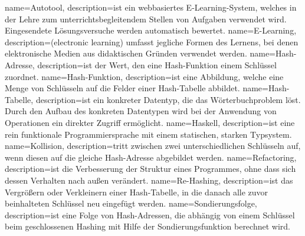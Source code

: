 {
	name=Autotool,
	description={ist ein webbasiertes E-Learning-System, welches in der Lehre zum unterrichtsbegleitendem Stellen von Aufgaben verwendet wird. Eingesendete Lösungsversuche werden automatisch bewertet.}
}
{
	name=E-Learning,
	description={(electronic learning) umfasst jegliche Formen des Lernens, bei denen elektronische Medien aus didaktischen Gründen verwendet werden.}
}
{
	name=Hash-Adresse,
	description={ist der Wert, den eine Hash-Funktion einem Schlüssel zuordnet.}
}
{
	name=Hash-Funktion,
	description={ist eine Abbildung, welche eine Menge von Schlüsseln auf die Felder einer Hash-Tabelle abbildet.}
}
{
	name=Hash-Tabelle,
	description={ist ein konkreter Datentyp, die das Wörterbuchproblem löst. Durch den Aufbau des konkreten Datentypen wird bei der Anwendung von Operationen ein direkter Zugriff ermöglicht.}
}
{
	name=Haskell,
	description={ist eine rein funktionale Programmiersprache mit einem statischen, starken Typsystem.}
}
{
	name=Kollision,
	description={tritt zwischen zwei unterschiedlichen Schlüsseln auf, wenn diesen auf die gleiche Hash-Adresse abgebildet werden.}
}
{
	name=Refactoring,
	description={ist die Verbesserung der Struktur eines Programmes, ohne dass sich dessen Verhalten nach außen verändert.}
}
{
	name=Re-Hashing,
	description={ist das Vergrößern oder Verkleinern einer Hash-Tabelle, in die danach alle zuvor beinhalteten Schlüssel neu eingefügt werden.}
}
{
	name=Sondierungsfolge,
	description={ist eine Folge von Hash-Adressen, die abhängig von einem Schlüssel beim geschlossenen Hashing mit Hilfe der Sondierungsfunktion berechnet wird.}
}
